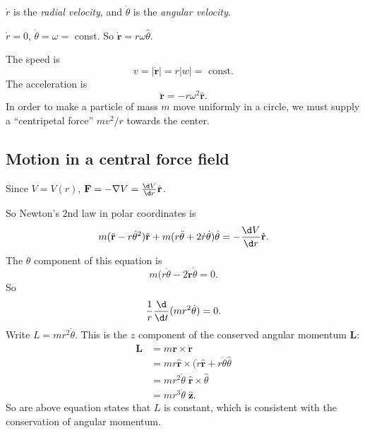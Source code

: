 \documentclass[a4paper]{article}
\begin{document}
\begin{defi}
  $\dot{r}$ is the \emph{radial velocity}, and $\dot{\theta}$ is the \emph{angular velocity}.
\end{defi}

\begin{eg}
  $\dot{r} = 0$, $\dot{\theta} = \omega = $ const.  So $\dot{\mathbf{r}} = r\omega\hat{\theta}$.

  The speed is 
  \[
    v = |\dot{\mathbf{r}}| = r|w| = \text{ const}.
  \]
  The acceleration is
  \[
    \ddot{\mathbf{r}} = -r\omega^2 \hat{\mathbf{r}}.
  \]
  In order to make a particle of mass $m$ move uniformly in a circle, we must supply a ``centripetal force'' $mv^2/r$ towards the center.
\end{eg}

\subsection{Motion in a central force field}
Since $V = V(r)$, $\mathbf{F} = -\nabla V = \frac{\d V}{\d r} \hat{\mathbf{r}}$.

So Newton's 2nd law in polar coordinates is
\[
  m(\ddot{\mathbf{r}} - r\hat{\theta}^2)\hat{\mathbf{r}} + m(r\ddot{\theta} + 2\dot{r}\dot{\theta})\hat{\theta} = -\frac{\d V}{\d r}\hat{\mathbf{r}}.
\]
The $\theta$ component of this equation is
\[
  m(r\ddot{\theta} - 2\dot{\mathbf{r}}\dot{\theta} = 0.
\]
So
\[
  \frac{1}{r}\frac{\d }{\d t}(mr^2 \dot{\theta}) = 0.
\]
Write $L = mr^2 \dot{\theta}$. This is the $z$ component of the conserved angular momentum $\mathbf{L}$:
\begin{align*}
  \mathbf{L} &= m\mathbf{r}\times \dot{\mathbf{r}}\\
  &= mr\hat{\mathbf{r}}\times (\dot{r}\hat{\mathbf{r}} + r\dot{\theta}\hat{\theta}\\
  &= mr^2 \dot{\theta}\; \hat{\mathbf{r}}\times \hat{\theta}\\
  &= mr^3 \dot{\theta}\; \hat{\mathbf{z}}.
\end{align*}
So are above equation states that $L$ is constant, which is consistent with the conservation of angular momentum.
\end{document}
